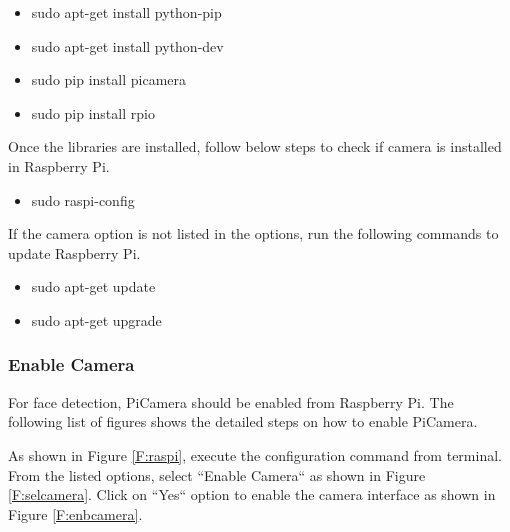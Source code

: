 \documentclass[sigconf]{acmart}
\begin{document}
\begin{itemize}
\item sudo apt-get install python-pip
\item sudo apt-get install python-dev
\item sudo pip install picamera
\item sudo pip install rpio
\end{itemize}

Once the libraries are installed, follow below steps to check if camera is installed in Raspberry Pi.
\begin{itemize}
\item sudo raspi-config
\end{itemize}


If the camera option is not listed in the options, run the following commands to update Raspberry Pi.
\begin{itemize}
\item sudo apt-get update
\item sudo apt-get upgrade
\end{itemize}

\subsubsection{Enable Camera}
For face detection, PiCamera should be enabled from Raspberry Pi. The following list of figures shows the detailed steps on how to enable PiCamera.

As shown in Figure \ref{F:raspi}, execute the configuration command from terminal. From the listed options, select ``Enable Camera`` as shown in Figure \ref{F:selcamera}. Click on ``Yes`` option to enable the camera interface as shown in Figure \ref{F:enbcamera}.
\end{document}

